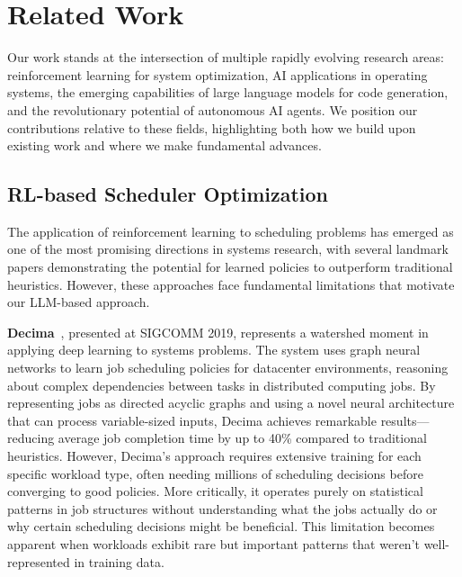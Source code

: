\section{Related Work}

Our work stands at the intersection of multiple rapidly evolving research areas: reinforcement learning for system optimization, AI applications in operating systems, the emerging capabilities of large language models for code generation, and the revolutionary potential of autonomous AI agents. We position our contributions relative to these fields, highlighting both how we build upon existing work and where we make fundamental advances.

\subsection{RL-based Scheduler Optimization}

The application of reinforcement learning to scheduling problems has emerged as one of the most promising directions in systems research, with several landmark papers demonstrating the potential for learned policies to outperform traditional heuristics. However, these approaches face fundamental limitations that motivate our LLM-based approach.

\textbf{Decima}~\cite{mao2019decima}, presented at SIGCOMM 2019, represents a watershed moment in applying deep learning to systems problems. The system uses graph neural networks to learn job scheduling policies for datacenter environments, reasoning about complex dependencies between tasks in distributed computing jobs. By representing jobs as directed acyclic graphs and using a novel neural architecture that can process variable-sized inputs, Decima achieves remarkable results—reducing average job completion time by up to 40\% compared to traditional heuristics. However, Decima's approach requires extensive training for each specific workload type, often needing millions of scheduling decisions before converging to good policies. More critically, it operates purely on statistical patterns in job structures without understanding what the jobs actually do or why certain scheduling decisions might be beneficial. This limitation becomes apparent when workloads exhibit rare but important patterns that weren't well-represented in training data.

